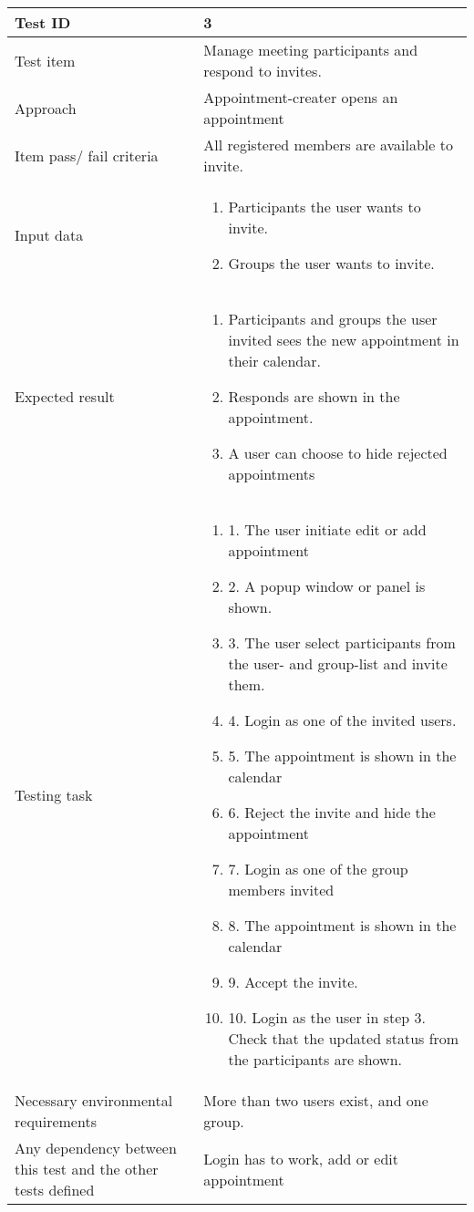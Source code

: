 \documentclass[a4paper, 10pt]{article}
\begin{document}
\begin{tabularx}{\textwidth}{ |X|X| }
\hline
\rowcolor{Gray}
Test ID & 3 \\ \hline
Test item & Manage meeting participants and respond to invites. \\ \hline
Approach & Appointment-creater opens an appointment \\ \hline
Item pass/ fail criteria & All registered members are available to invite. \\ \hline
Input data &
\begin{enumerate}
\item Participants the user wants to invite.
\item Groups the user wants to invite.
\end{enumerate}\\ \hline
Expected result &
\begin{enumerate}
\item Participants and groups the user invited sees the new appointment in their calendar.
\item Responds are shown in the appointment.
\item A user can choose to hide rejected appointments
\end{enumerate} \\ \hline
Testing task &
\begin{enumerate}
\item 1. The user initiate edit or add appointment
\item 2. A popup window or panel is shown.
\item 3. The user select participants from the user- and group-list and invite them.
\item 4. Login as one of the invited users.
\item 5. The appointment is shown in the calendar
\item 6. Reject the invite and hide the appointment
\item 7. Login as one of the group members invited
\item 8. The appointment is shown in the calendar
\item 9. Accept the invite.
\item 10. Login as the user in step 3. Check that the updated status from the participants are shown.
\end{enumerate}	\\ \hline
Necessary environmental requirements & More than two users exist, and one group. \\ \hline
Any dependency between this test and the other tests defined & Login has to work, add or edit appointment \\ \hline

\end{tabularx}
\end{document}
